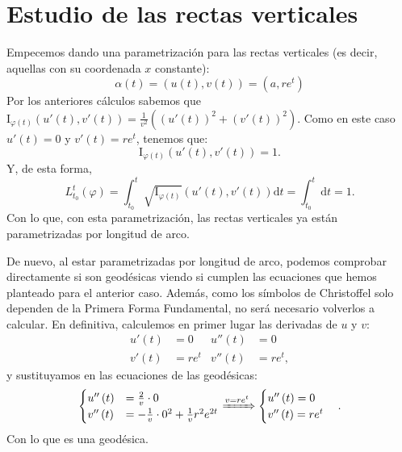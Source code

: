 \section{Estudio de las rectas verticales}
Empecemos dando una parametrización para las rectas verticales (es decir,
aquellas con su coordenada $x$ constante):
\[
\alpha\left( t \right) = \left( u\left( t \right), v\left( t \right) \right) =
\left( a, re^t \right)
\]
Por los anteriores cálculos sabemos que $\mathrm{I}_{\varphi\left( t
\right)}\left( u'\left( t \right), v'\left( t \right) \right) =
\frac{1}{v^2}\left( \left( u'\left( t \right) \right)^2 + \left( v'\left( t
\right) \right)^2 \right)$. Como en este caso $u'\left( t \right) = 0$ y
$v'\left( t \right) = r e^t$, tenemos que:
\[
\mathrm{I}_{\varphi\left( t \right)} \left( u'\left( t \right), v'\left( t
\right) \right) = 1.
\]
Y, de esta forma,
\[
L_{t_0}^t \left( \varphi \right) = \int_{t_0}^{t}
\sqrt{\mathrm{I}_{\varphi\left( t \right)}} \left( u'\left( t \right), v'\left(
t \right) \right) \mathrm{d}t = \int_{t_0}^{t} \mathrm{d}t = 1.
\]
Con lo que, con esta parametrización, las rectas verticales ya están
parametrizadas por longitud de arco.

De nuevo, al estar parametrizadas por longitud de arco, podemos comprobar
directamente si son geodésicas viendo si cumplen las ecuaciones que hemos
planteado para el anterior caso. Además, como los símbolos de Christoffel solo
dependen de la Primera Forma Fundamental, no será necesario volverlos a
calcular. En definitiva, calculemos en primer lugar las derivadas de $u$ y $v$:
\begin{align*}
    u'\left( t \right) &= 0 & u''\left( t \right) &= 0\\
    v'\left( t \right) &= r e^t & v''\left( t \right) &= re^t,
\end{align*}
y sustituyamos en las ecuaciones de las geodésicas:
\[
\begin{cases}
    u''\left( t \right) &= \frac{2}{v} \cdot 0\\
    v''\left( t \right) &= - \frac{1}{v} \cdot 0^2 + \frac{1}{v} r^2 e^{2t} 
\end{cases} \xRightarrow{v = re^t} \begin{cases}
    u''\left( t \right) = 0\\
    v''\left( t \right) = re^t
\end{cases}.
\]
Con lo que es una geodésica.
